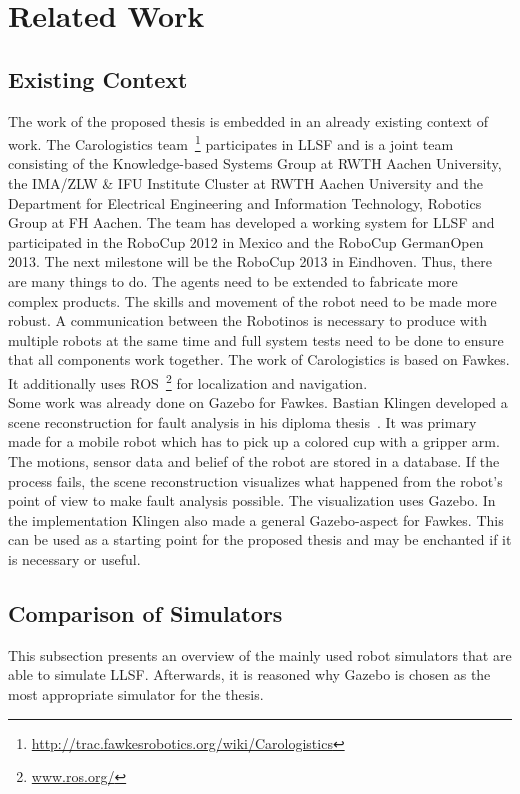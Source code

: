 \documentclass[11pt,a4paper]{article}
\begin{document}
\section{Related Work}
\subsection{Existing Context}
The work of the proposed thesis is embedded in an already existing context of work. The Carologistics team~\footnote{\url{http://trac.fawkesrobotics.org/wiki/Carologistics}} participates in LLSF and is a joint team consisting of the Knowledge-based Systems Group at RWTH Aachen University, the IMA/ZLW \& IFU Institute Cluster at RWTH Aachen University and the Department for Electrical Engineering and Information Technology, Robotics Group at FH Aachen. The team has developed a working system for LLSF and participated in the RoboCup 2012 in Mexico and the RoboCup GermanOpen 2013. The next milestone will be the RoboCup 2013 in Eindhoven. Thus, there are many things to do. The agents need to be extended to fabricate more complex products. The skills and movement of the robot need to be made more robust. A communication between the Robotinos is necessary to produce with multiple robots at the same time and full system tests need to be done to ensure that all components work together. The work of Carologistics is based on Fawkes. It additionally uses ROS~\footnote{\url{www.ros.org/}} for localization and navigation.\\
Some work was already done on Gazebo for Fawkes. Bastian Klingen developed a scene reconstruction for fault analysis in his diploma thesis~\cite{KlingenDA}. It was primary made for a mobile robot which has to pick up a colored cup with a gripper arm. The motions, sensor data and belief of the robot are stored in a database. If the process fails, the scene reconstruction visualizes what happened from the robot's point of view to make fault analysis possible. The visualization uses Gazebo. In the implementation Klingen also made a general Gazebo-aspect for Fawkes. This can be used as a starting point for the proposed thesis and may be enchanted if it is necessary or useful.
\subsection{Comparison of Simulators}
This subsection presents an overview of the mainly used robot simulators that are able to simulate LLSF. Afterwards, it is reasoned why Gazebo is chosen as the most appropriate simulator for the thesis.
\end{document}
